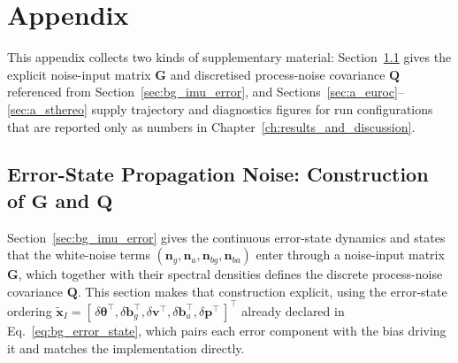 \chapter{Appendix}
\label{ch:appendix}

This appendix collects two kinds of supplementary material: Section~\ref{sec:a_gq} gives the explicit noise-input matrix $\mathbf{G}$ and discretised process-noise covariance $\mathbf{Q}$ referenced from Section~\ref{sec:bg_imu_error}, and Sections~\ref{sec:a_euroc}--\ref{sec:a_sthereo} supply trajectory and diagnostics figures for run configurations that are reported only as numbers in Chapter~\ref{ch:results_and_discussion}.

\section{Error-State Propagation Noise: Construction of \texorpdfstring{$\mathbf{G}$}{G} and \texorpdfstring{$\mathbf{Q}$}{Q}}
\label{sec:a_gq}
Section~\ref{sec:bg_imu_error} gives the continuous error-state dynamics and states that the white-noise terms $(\mathbf{n}_g, \mathbf{n}_a, \mathbf{n}_{bg}, \mathbf{n}_{ba})$ enter through a noise-input matrix $\mathbf{G}$, which together with their spectral densities defines the discrete process-noise covariance $\mathbf{Q}$. This section makes that construction explicit, using the error-state ordering $\tilde{\mathbf{x}}_I = [\,\delta\boldsymbol{\theta}^\top, \delta\mathbf{b}_g^\top, \delta\mathbf{v}^\top, \delta\mathbf{b}_a^\top, \delta\mathbf{p}^\top\,]^\top$ already declared in Eq.~\ref{eq:bg_error_state}, which pairs each error component with the bias driving it and matches the implementation directly.

